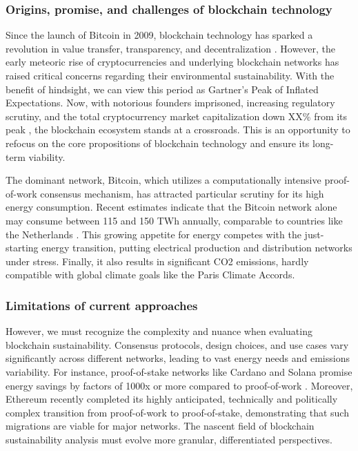 \documentclass[11pt]{report}
\begin{document}
\subsubsection*{Origins, promise, and challenges of blockchain technology}
Since the launch of Bitcoin in 2009, blockchain technology has sparked a revolution in value transfer, transparency, and decentralization \cite{nakamotoBitcoinPeertopeerElectronic2008}. However, the early meteoric rise of cryptocurrencies and underlying blockchain networks has raised critical concerns regarding their environmental sustainability. With the benefit of hindsight, we can view this period as Gartner's Peak of Inflated Expectations. Now, with notorious founders imprisoned, increasing regulatory scrutiny, and the total cryptocurrency market capitalization down
XX\% from its peak , the blockchain ecosystem stands at a crossroads. This is an opportunity to refocus on the core propositions of blockchain technology and ensure its long-term viability.


The dominant network, Bitcoin, which utilizes a computationally intensive proof-of-work consensus mechanism, has attracted particular scrutiny for its high energy consumption. Recent estimates indicate that the Bitcoin network alone may consume between 115 and 150 TWh annually, comparable to countries like the Netherlands \cite{devriesRevisitingBitcoinCarbon2022,neumuellerCambridgeBitcoinElectricity2021}. This growing appetite for energy competes with the just-starting energy transition, putting electrical production and distribution networks under stress. Finally, it also results in significant CO2 emissions, hardly compatible with global climate goals like the Paris Climate Accords.

\subsubsection*{Limitations of current approaches}
However, we must recognize the complexity and nuance when evaluating blockchain sustainability. Consensus protocols, design choices, and use cases vary significantly across different networks, leading to vast energy needs and emissions variability. For instance, proof-of-stake networks like Cardano and Solana promise energy savings by factors of 1000x or more compared to proof-of-work \cite{kohliAnalysisEnergyConsumption2023}. Moreover, Ethereum recently completed its highly anticipated, technically and politically complex transition from proof-of-work to proof-of-stake, demonstrating that such migrations are viable for major networks. \cite{bloombergnewsEthereumMergeYour2022} The nascent field of blockchain sustainability analysis must evolve more granular, differentiated perspectives.
\end{document}
